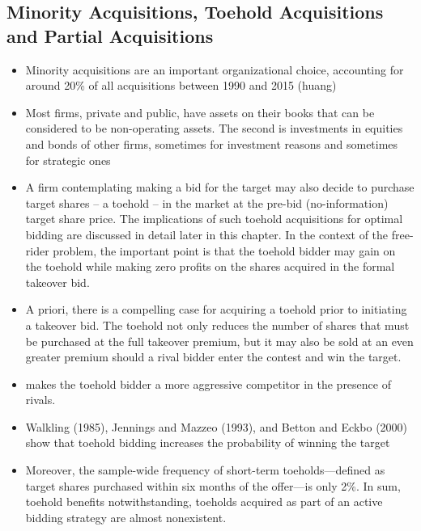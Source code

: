 \documentclass[12pt]{article}
\begin{document}
\subsection{Minority Acquisitions, Toehold Acquisitions and Partial Acquisitions}

    \begin{itemize}

        \item Minority acquisitions are an important organizational choice, accounting for around 20\% of all acquisitions between 1990 and 2015 (huang)

        \item Most firms, private and public, have assets on their books that can be considered to be non-operating assets. The second is investments in equities and bonds of other firms, sometimes for investment reasons and sometimes for strategic ones \citep{Damodaran2005}

        \item A firm contemplating making a bid for the target may also decide to purchase target shares -- a toehold -- in the market at the pre-bid (no-information) target share price. The implications of such toehold acquisitions for optimal bidding are discussed in detail later in this chapter. In the context of the free-rider problem, the important point is that the toehold bidder may gain on the toehold while making zero profits on the shares acquired in the formal takeover bid. \citep{Mitchell2011}

        \item A priori, there is a compelling case for acquiring a toehold prior to initiating a takeover bid. The toehold not only reduces the number of shares that must be purchased at the full takeover premium, but it may also be sold at an even greater premium should a rival bidder enter the contest and win the target. \citep{Mitchell2011}

        \item makes the toehold bidder a more aggressive competitor in the presence of rivals. \citep{Mitchell2011}

        \item Walkling (1985), Jennings and Mazzeo (1993), and Betton and Eckbo (2000) show that toehold bidding increases the probability of winning the target \citep{Mitchell2011}

        \item Moreover, the sample-wide frequency of short-term toeholds—defined as target shares purchased within six months of the offer—is only 2\%. In sum, toehold benefits notwithstanding, toeholds acquired as part of an active bidding strategy are almost nonexistent. \citep{Mitchell2011}


\end{itemize}
\end{document}
